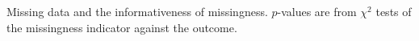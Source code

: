\begin{table}[t]
\centering
\small
\caption{Missing data and the informativeness of missingness. $p$-values are from $\chi^2$ tests of the missingness indicator against the outcome.}\label{tab:missing}
\resizebox{\ifdim\width>\textwidth\textwidth\else\width\fi}{!}{}
\end{table}
